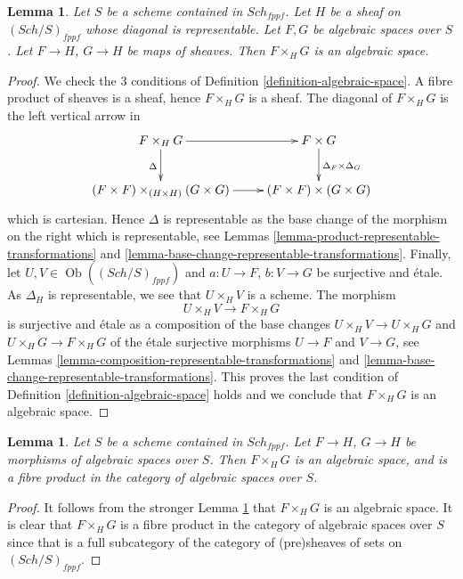 \documentclass{stacks-project}
\theoremstyle{plain}
\newtheorem{lemma}[subsection]{Lemma}
\theoremstyle{definition}
\theoremstyle{remark}
\numberwithin{equation}{subsection}
\def\Sch{\mathit{Sch}}
\def\Ob{\mathop{\mathrm{Ob}}\nolimits}
\begin{document}
\begin{lemma}
\label{lemma-fibre-product-spaces-over-sheaf-with-representable-diagonal}
Let $S$ be a scheme contained in $\Sch_{fppf}$.
Let $H$ be a sheaf on $(\Sch/S)_{fppf}$ whose diagonal
is representable. Let $F, G$ be algebraic spaces over $S$.
Let $F \to H$, $G \to H$ be maps of sheaves.
Then $F \times_H G$ is an algebraic space.
\end{lemma}

\begin{proof}
We check the 3 conditions of
Definition \ref{definition-algebraic-space}.
A fibre product of sheaves is a sheaf, hence $F \times_H G$ is a sheaf.
The diagonal of $F \times_H G$ is the left vertical arrow in
$$
\xymatrix{
F \times_H G \ar[r] \ar[d]_\Delta &
F \times G \ar[d]^{\Delta_F \times \Delta_G} \\
(F \times F) \times_{(H \times H)} (G \times G) \ar[r] &
(F \times F) \times (G \times G)
}
$$
which is cartesian. Hence $\Delta$ is representable as the base change
of the morphism on the right which is representable, see
Lemmas \ref{lemma-product-representable-transformations} and
\ref{lemma-base-change-representable-transformations}.
Finally, let $U, V \in \Ob((\Sch/S)_{fppf})$
and $a : U \to F$, $b : V \to G$ be surjective and \'etale.
As $\Delta_H$ is representable, we see that $U \times_H V$ is a scheme.
The morphism
$$
U \times_H V \longrightarrow F \times_H G
$$
is surjective and \'etale as a composition of the base changes
$U \times_H V \to U \times_H G$ and $U \times_H G \to F \times_H G$
of the \'etale surjective morphisms $U \to F$ and $V \to G$, see
Lemmas \ref{lemma-composition-representable-transformations} and
\ref{lemma-base-change-representable-transformations}.
This proves the last condition of
Definition \ref{definition-algebraic-space}
holds and we conclude that $F \times_H G$ is an algebraic space.
\end{proof}

\begin{lemma}
\label{lemma-fibre-product-spaces}
Let $S$ be a scheme contained in $\Sch_{fppf}$.
Let $F \to H$, $G \to H$ be morphisms of algebraic spaces over $S$.
Then $F \times_H G$ is an algebraic space, and is a fibre product
in the category of algebraic spaces over $S$.
\end{lemma}

\begin{proof}
It follows from the stronger
Lemma \ref{lemma-fibre-product-spaces-over-sheaf-with-representable-diagonal}
that $F \times_H G$ is an algebraic space.
It is clear that $F \times_H G$
is a fibre product in the category of algebraic spaces over $S$
since that is a full subcategory of the category
of (pre)sheaves of sets on $(\Sch/S)_{fppf}$.
\end{proof}
\end{document}
